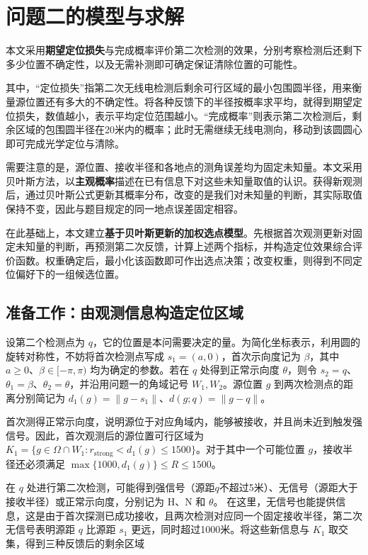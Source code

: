 \section{问题二的模型与求解}

本文采用\textbf{期望定位损失}与{完成概率}评价第二次检测的效果，分别考察检测后还剩下多少位置不确定性，以及无需补测即可确定保证清除位置的可能性。

其中，“定位损失”指第二次无线电检测后剩余可行区域的最小包围圆半径，用来衡量源位置还有多大的不确定性。将各种反馈下的半径按概率求平均，就得到期望定位损失，数值越小，表示平均定位范围越小。“完成概率”则表示第二次检测后，剩余区域的包围圆半径在20米内的概率；此时无需继续无线电测向，移动到该圆圆心即可完成光学定位与清除。

需要注意的是，源位置、接收半径和各地点的测角误差均为固定未知量。本文采用贝叶斯方法，以\textbf{主观概率}描述在已有信息下对这些未知量取值的认识。获得新观测后，通过贝叶斯公式更新其概率分布，改变的是我们对未知量的判断，其实际取值保持不变，因此与题目规定的同一地点误差固定相容。

在此基础上，本文建立\textbf{基于贝叶斯更新的加权选点模型}。先根据首次观测更新对固定未知量的判断，再预测第二次反馈，计算上述两个指标，并构造定位效果综合评价函数。权重确定后，最小化该函数即可作出选点决策；改变权重，则得到不同定位偏好下的一组候选位置。

\subsection{准备工作：由观测信息构造定位区域}

设第二个检测点为 \(q\)，它的位置是本问需要决定的量。为简化坐标表示，利用圆的旋转对称性，不妨将首次检测点写成 \(s_1=(a,0)\)，首次示向度记为 \(\beta\)，其中 \(a\ge0\)、\(\beta\in[-\pi,\pi)\) 均为确定的参数。若在 \(q\) 处得到正常示向度 \(\theta\)，则令 \(s_2=q\)、\(\theta_1=\beta\)、\(\theta_2=\theta\)，并沿用问题一的角域记号 \(W_1,W_2\)。源位置 \(g\) 到两次检测点的距离分别简记为 \(d_1(g)=\|g-s_1\|\)、\(d(g;q)=\|g-q\|\)。

首次测得正常示向度，说明源位于对应角域内，能够被接收，并且尚未近到触发强信号。因此，首次观测后的源位置可行区域为 \(K_1=\{g\in\Omega\cap W_1:r_{\mathrm{strong}}<d_1(g)\le1500\}\)。对于其中一个可能位置 \(g\)，接收半径还必须满足 \(\max\{1000,d_1(g)\}\le R\le1500\)。

在 \(q\) 处进行第二次检测，可能得到强信号（源距\(q\)不超过5米）、无信号（源距大于接收半径）或正常示向度，分别记为 \(\mathrm H\)、\(\mathrm N\) 和 \(\theta\)。
在这里，无信号也能提供信息，这是由于首次探测已成功接收，且两次检测对应同一个固定接收半径，第二次无信号表明源距 \(q\) 比源距 \(s_1\) 更远，同时超过1000米。将这些新信息与 \(K_1\) 取交集，得到三种反馈后的剩余区域

